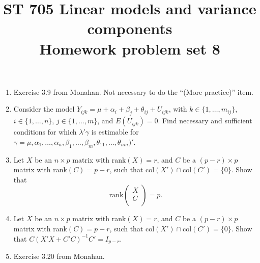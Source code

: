 \documentclass[11pt]{article}
\title{ST 705 Linear models and variance components \\ 
        Homework problem set 8}
\begin{document}
\maketitle

\begin{enumerate}

\item Exercise 3.9 from Monahan.  Not necessary to do the ``(More practice)'' item. 

\item Consider the model $Y_{ijk} = \mu + \alpha_{i} + \beta_{j} + \theta_{ij} + U_{ijk}$, with $k \in \{1,\dots,m_{ij}\}$, $i \in \{1,\dots,n\}$, $j \in \{1,\dots,m\}$, and $E(U_{ijk}) = 0$.  Find necessary and sufficient conditions for which $\lambda'\gamma$ is estimable for $\gamma = \mu, \alpha_{1}, \dots, \alpha_{n}, \beta_{1}, \dots, \beta_{m}, \theta_{11}, \dots, \theta_{nm})'$.

\item  Let $X$ be an $n\times p$ matrix with rank$(X) = r$, and $C$ be a $(p-r)\times p$ matrix with rank$(C) = p-r$, such that col$(X') \cap \text{col}(C') = \{0\}$.  Show that 
\[
\text{rank}
\begin{pmatrix}
X \\
C \\
\end{pmatrix} = p.
\]

\item  Let $X$ be an $n\times p$ matrix with rank$(X) = r$, and $C$ be a $(p-r)\times p$ matrix with rank$(C) = p-r$, such that col$(X') \cap \text{col}(C') = \{0\}$.  Show that $C(X'X + C'C)^{-1}C' = I_{p-r}$.

\item Exercise 3.20 from Monahan.


\end{enumerate}
\end{document}
